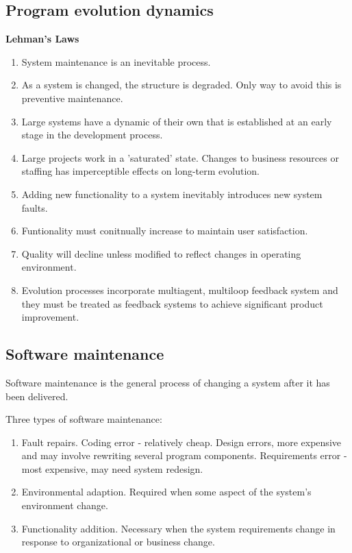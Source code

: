 \documentclass{article}
\begin{document}
\subsection{Program evolution dynamics}
\textbf{Lehman's Laws}
\begin{enumerate}
    \item System maintenance is an inevitable process.
    \item As a system is changed, the structure is degraded.  Only way to avoid this is preventive maintenance.
    \item Large systems have a dynamic of their own that is established at an early stage in the development process.
    \item Large projects work in a 'saturated' state.  Changes to business resources or staffing has imperceptible effects on long-term evolution.
    \item Adding new functionality to a system inevitably introduces new system faults.
    \item Funtionality must conitnually increase to maintain user satisfaction.
    \item Quality will decline unless modified to reflect changes in operating environment.
    \item Evolution processes incorporate multiagent, multiloop feedback system and they must be treated as feedback systems to achieve significant product improvement.
\end{enumerate}

\subsection{Software maintenance}
Software maintenance is the general process of changing a system after it has been delivered.

Three types of software maintenance:
\begin{enumerate}
    \item Fault repairs.  Coding error - relatively cheap.  Design errors, more expensive and may involve rewriting several program components. Requirements error - most expensive, may need system redesign.
    \item Environmental adaption.  Required when some aspect of the system's environment change.
    \item Functionality addition.  Necessary when the system requirements change in response to organizational or business change.
\end{enumerate}
\end{document}
